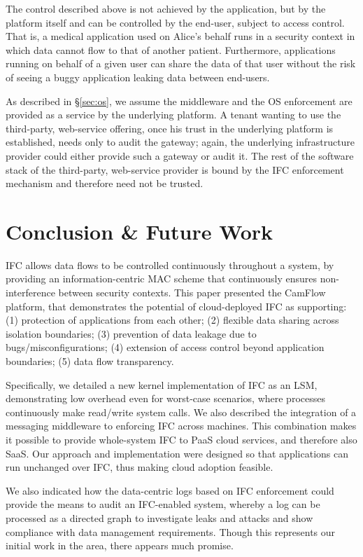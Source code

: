 \documentclass[10pt,journal,compsoc]{IEEEtran}
\begin{document}
The control described above is not achieved by the application, but by the platform itself and can be controlled by the end-user, subject to access control. 
That is, a medical application used on Alice's behalf runs in a security context in which data cannot flow to that of another patient. 
Furthermore, applications running on behalf of a given user can share the data of that user without the risk of seeing a buggy application leaking data between end-users.

As described in \S\ref{sec:os}, we assume the middleware and the OS enforcement are provided as a service by the underlying platform. 
A tenant wanting to use the third-party, web-service offering, once his trust in the underlying platform is established, needs only to audit the gateway; again, the underlying infrastructure provider could either provide such a gateway or audit it.
The rest of the software stack of the third-party, web-service provider is bound by the IFC enforcement mechanism and therefore need not be trusted.


 
\section{Conclusion \& Future Work}
\label{sec:conclusion}




IFC  allows data flows to be controlled continuously throughout a system, by providing an information-centric MAC scheme that continuously ensures non-interference between security contexts.
This paper presented the CamFlow platform, that demonstrates the potential of cloud-deployed IFC as supporting: 
(1) protection of applications from each other; 
(2) flexible data sharing across isolation boundaries;
(3) prevention of data leakage due to bugs/misconfigurations;
(4) extension of access control beyond application boundaries;
(5) data flow transparency.


Specifically, we detailed a new kernel implementation of IFC as an LSM, demonstrating low overhead even for worst-case scenarios, where processes continuously make read/write system calls.  We also described the integration of a messaging middleware to enforcing IFC across machines.
This combination makes it possible to provide whole-system IFC to PaaS cloud services, and therefore also SaaS.
Our approach and implementation were designed so that applications can run unchanged over IFC, thus making cloud adoption feasible.

We also indicated how the data-centric logs based on IFC enforcement could provide the means to audit an IFC-enabled system, whereby a log can be processed as a directed graph to investigate leaks and attacks and show compliance with data management requirements. Though this represents our initial work in the area, there appears much promise. 
\end{document}
